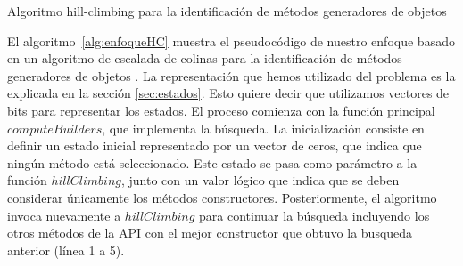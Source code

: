 \begin{algorithm}[H]
    \caption{Algoritmo hill-climbing para la identificación de métodos
    generadores de objetos}
    \label{alg:enfoqueHC}

    \BlankLine

    \BlankLine

    \BlankLine



\end{algorithm}

El algoritmo~\ref{alg:enfoqueHC} muestra el pseudocódigo de nuestro enfoque basado en un algoritmo de escalada de colinas para la identificación de métodos generadores de objetos . 
La representación que hemos utilizado del problema es la explicada en la sección
\ref{sec:estados}. Esto quiere decir que utilizamos vectores de bits para
representar los estados. 
El proceso comienza con la función principal $computeBuilders$, que implementa
la búsqueda. 
La inicialización consiste en definir un estado inicial representado por un vector de ceros, 
que indica que ningún método está seleccionado. Este estado se pasa como parámetro a la función $hillClimbing$, junto con un valor lógico que indica que se deben considerar únicamente los métodos constructores. 
Posteriormente, el algoritmo invoca nuevamente a $hillClimbing$ para continuar la búsqueda incluyendo los otros métodos de la API con el mejor constructor que obtuvo
la busqueda anterior (línea 1 a 5).

